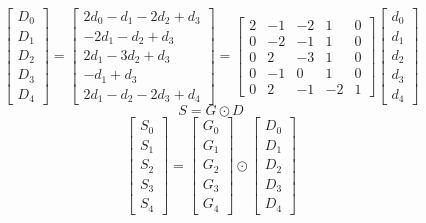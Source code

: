 \documentclass{article}%
\begin{document}
\[%
\left[\begin{matrix}D_{0}\\D_{1}\\D_{2}\\D_{3}\\D_{4}\end{matrix}\right] = \left[\begin{matrix}2 d_{0} - d_{1} - 2 d_{2} + d_{3}\\- 2 d_{1} - d_{2} + d_{3}\\2 d_{1} - 3 d_{2} + d_{3}\\- d_{1} + d_{3}\\2 d_{1} - d_{2} - 2 d_{3} + d_{4}\end{matrix}\right] = \left[\begin{matrix}2 & -1 & -2 & 1 & 0\\0 & -2 & -1 & 1 & 0\\0 & 2 & -3 & 1 & 0\\0 & -1 & 0 & 1 & 0\\0 & 2 & -1 & -2 & 1\end{matrix}\right] \left[\begin{matrix}d_{0}\\d_{1}\\d_{2}\\d_{3}\\d_{4}\end{matrix}\right]%
\]%
\[%
S = G \odot D%
\]%
\[%
\left[\begin{matrix}S_{0}\\S_{1}\\S_{2}\\S_{3}\\S_{4}\end{matrix}\right] = \left[\begin{matrix}G_{0}\\G_{1}\\G_{2}\\G_{3}\\G_{4}\end{matrix}\right] \odot \left[\begin{matrix}D_{0}\\D_{1}\\D_{2}\\D_{3}\\D_{4}\end{matrix}\right]%
\]%
\end{document}
